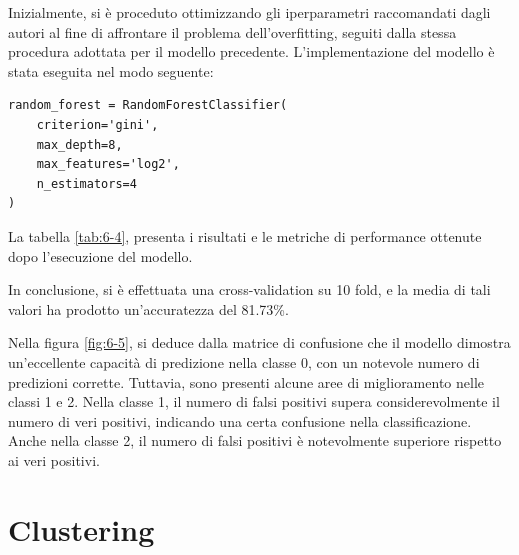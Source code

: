 Inizialmente, si è proceduto ottimizzando gli iperparametri raccomandati dagli autori \cite{iqbal2022exploring} al fine di affrontare il problema dell'overfitting, seguiti dalla stessa procedura adottata per il modello precedente. L'implementazione del modello è stata eseguita nel modo seguente:

\bigskip

\begin{lstlisting}
random_forest = RandomForestClassifier(
    criterion='gini',
    max_depth=8,
    max_features='log2',
    n_estimators=4
)
\end{lstlisting}

\bigskip

La tabella \ref{tab:6-4}, presenta i risultati e le metriche di performance ottenute dopo l'esecuzione del modello.

\bigskip

In conclusione, si è effettuata una cross-validation su 10 fold, e la media di tali valori ha prodotto un'accuratezza del 81.73\%.

\bigskip

Nella figura \ref{fig:6-5}, si deduce dalla matrice di confusione che il modello dimostra un'eccellente capacità di predizione nella classe 0, con un notevole numero di predizioni corrette. Tuttavia, sono presenti alcune aree di miglioramento nelle classi 1 e 2. Nella classe 1, il numero di falsi positivi supera considerevolmente il numero di veri positivi, indicando una certa confusione nella classificazione. Anche nella classe 2, il numero di falsi positivi è notevolmente superiore rispetto ai veri positivi.

\section{Clustering}

